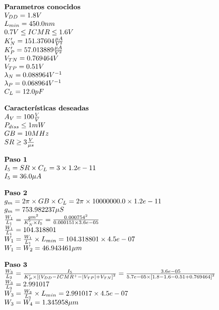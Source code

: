 \begin{equation*}
	\begin{array}{l l}
		\textbf{Parametros conocidos} \\
		V_{DD} =  1.8  V \\
		L_{min} =  450.0  nm \\
		0.7 V \leq ICMR \leq 1.6 V \\
		K'_{N} =  151.37604  \frac{\mu A}{V^{2}} \\
		K'_{P} =  57.013889  \frac{\mu A}{V^{2}} \\
		V_{TN} =  0.769464  V \\
		V_{TP} =  0.51  V \\
		\lambda_{N} =  0.088964  V^{-1} \\
		\lambda_{P} =  0.068964  V^{-1} \\
		C_{L} =  12.0  pF \\
		\\
		\textbf{Características deseadas} \\
		A_{V} =  100  \frac{V}{V} \\
		P_{diss} \leq  1  mW \\
		GB =  10  MHz \\
		SR \geq  3  \frac{V}{\mu s} \\
		\\
		\textbf{Paso 1} \\
		I_{5} = SR \times C_{L} = 3\times1.2e-11 \\
		I_{5} =  36.0 \mu A \\
		\\
		\textbf{Paso 2} \\
		g_{m} = 2\pi{} \times GB \times C_{L} = 2 \pi{} \times10000000.0\times 1.2e-11  \\
		g_{m} =  753.982237  \mu S \\
		\frac{W_1}{L_1} = \frac{gm^2}{K'_{N}\times I_5} = \frac{0.000754^2}{0.000151\times3.6e-05}\\
		\frac{W_1}{L_1} =  104.318801  \\
		W_{1} = \frac{W_1}{L_1} \times L_{min} =  104.318801 \times 4.5e-07  \\
		W_{1} = W_{2} =  46.943461  \mu m \\
		\\
		\textbf{Paso 3} \\
		\frac{W_3}{L_3} = \frac{I_5}{K'_{P}\times \left[(V_{DD}-ICMR^{+}-|V_{TP}|+V_{TN}\right]^{2}} = \frac{ 3.6e-05 }{ 5.7e-05 \times \left[ 1.8 - 1.6 - 0.51 + 0.769464 \right]^{2}} \\
		\frac{W_3}{L_3} =  2.991017  \\
		W_{3} = \frac{W_3}{L_3} \times L_{min} =  2.991017 \times 4.5e-07  \\
		W_{3} = W_{4} =  1.345958  \mu m \\
	\end{array}
\end{equation*}

